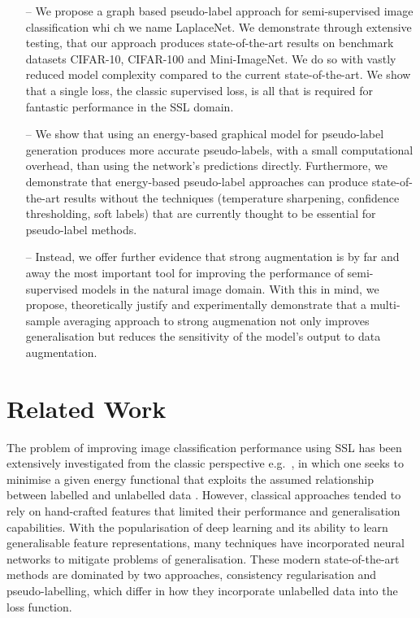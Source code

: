 \documentclass[journal]{IEEEtran}
\begin{document}
\begin{itemize}
  \item[--] We propose a graph based pseudo-label approach for semi-supervised image classification whi  ch we name LaplaceNet. We demonstrate through extensive testing, that our approach produces state-of-the-art results on benchmark datasets CIFAR-10, CIFAR-100 and Mini-ImageNet. We do so with vastly reduced model complexity compared to the current state-of-the-art. We show that a single loss, the classic supervised loss, is all that is required for fantastic performance in the SSL domain. 
  
  \item[--] We show that using an energy-based graphical model for pseudo-label generation produces more accurate pseudo-labels, with a small computational overhead, than using the network's predictions directly. Furthermore, we demonstrate that energy-based pseudo-label approaches can produce state-of-the-art results without the techniques (temperature sharpening, confidence thresholding, soft labels) that are currently thought to be essential for pseudo-label methods. 
    
  \item[--] Instead, we offer further evidence that strong augmentation is by far and away the most important tool for improving the performance of semi-supervised models in the natural image domain. With this in mind, we propose, theoretically justify and experimentally demonstrate that a multi-sample averaging approach to strong augmenation not only improves generalisation but reduces the sensitivity of the model's output to data augmentation. 
  
\end{itemize}


\section{Related Work}
The problem of improving image classification performance using SSL has been extensively investigated  from the classic perspective e.g.~\cite{belkin2006manifold,belkin2004regularization,zhu2003semi,zhou2004learning,grandvalet2005semi,kim2009semi}, in which one seeks to minimise a given energy functional that exploits the assumed relationship between labelled and unlabelled data \cite{SSTheory}. However, classical approaches tended to rely on hand-crafted features that limited their performance and generalisation capabilities. With the popularisation of deep learning and its ability to learn generalisable feature representations, many techniques have incorporated neural networks to mitigate problems of generalisation. These modern state-of-the-art methods are dominated by two approaches, consistency regularisation and pseudo-labelling, which differ in how they incorporate unlabelled data into the loss function. 
\end{document}
